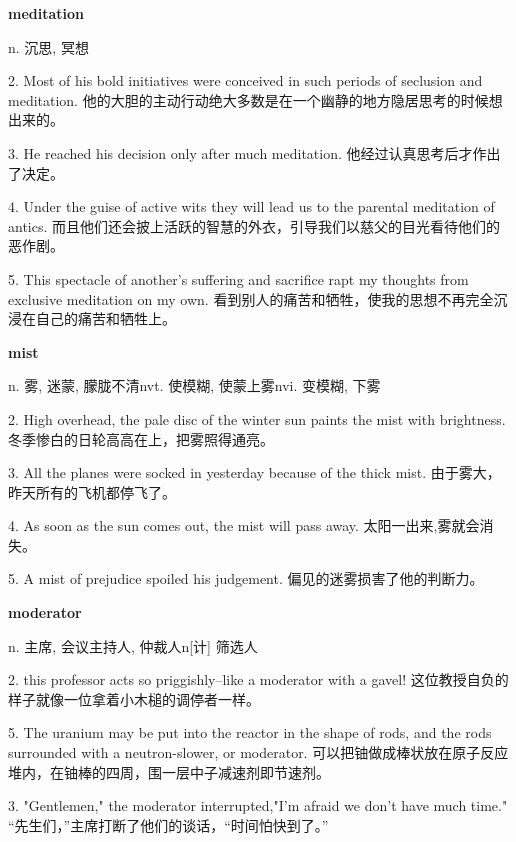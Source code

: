 \documentclass[12pt]{book}
\begin{document}
\vspace{12pt}

\textbf{meditation}

n. 沉思, 冥想

2.  Most of his bold initiatives were conceived in such periods of seclusion and meditation.  他的大胆的主动行动绝大多数是在一个幽静的地方隐居思考的时候想出来的。 


3.  He reached his decision only after much meditation.  他经过认真思考后才作出了决定。 


4.  Under the guise of active wits they will lead us to the parental meditation of antics.  而且他们还会披上活跃的智慧的外衣，引导我们以慈父的目光看待他们的恶作剧。 


5.  This spectacle of another's suffering and sacrifice rapt my thoughts from exclusive meditation on my own.  看到别人的痛苦和牺牲，使我的思想不再完全沉浸在自己的痛苦和牺牲上。 


\vspace{12pt}

\textbf{mist}

n. 雾, 迷蒙, 朦胧不清nvt. 使模糊, 使蒙上雾nvi. 变模糊, 下雾

2.  High overhead, the pale disc of the winter sun paints the mist with brightness.  冬季惨白的日轮高高在上，把雾照得通亮。 


3.  All the planes were socked in yesterday because of the thick mist.  由于雾大，昨天所有的飞机都停飞了。 


4.  As soon as the sun comes out, the mist will pass away.  太阳一出来,雾就会消失。 


5.  A mist of prejudice spoiled his judgement.  偏见的迷雾损害了他的判断力。 


\vspace{12pt}

\textbf{moderator}

n. 主席, 会议主持人, 仲裁人n[计] 筛选人

2.  this professor acts so priggishly--like a moderator with a gavel!  这位教授自负的样子就像一位拿着小木槌的调停者一样。 


5.  The uranium may be put into the reactor in the shape of rods, and the rods surrounded with a neutron-slower, or moderator.  可以把铀做成棒状放在原子反应堆内，在铀棒的四周，围一层中子减速剂即节速剂。 


3.  "Gentlemen," the moderator interrupted,"I'm afraid we don't have much time."  “先生们，”主席打断了他们的谈话，“时间怕快到了。” 
\end{document}
